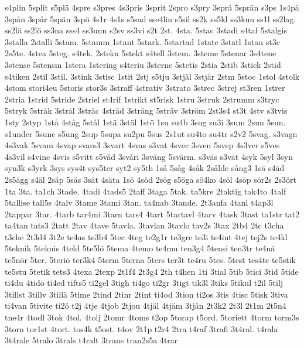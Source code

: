 {{s4plin
5split
s5pl^^e4
4spre
s3pres
4s3pris
3sprit
2spro
s3pry
3spr^^e5
5spr^^e4n
s3ps
1s4p^^e5
3sp^^e5n
3sp^^e5r
5sp^^e4n
3sp^^f6
4s1r
4s1s
s5sad
sse4lin
s5sil
ss2k
ss5kl
ss3kun
ss1l
ss2lag.
ss2l^^e4
ss2l^^f6
ss3na
sss4
ss3unn
s2sv
ss3vi
s2t
2st.
4sta.
5stac
3stadi
s4taf
5stalgis
3stalla
2stalli
5stam.
5stamm
1stant
5stark.
5startad
1state
3statl
1stau
st3c
2s5te.
4stea
5steg.
s4tek.
2stekn
5stekt
s4tell
3stem.
3steme
5stenar
3s4tene
3stense
5stensm
1stera
1stering
s4teriu
3sterne
5stetis
2stia
2stib
3stick
2stid
s4tiken
2stil
3stil.
3stink
3stisc
1stit
2stj
s5tju
3stj^^e4l
3stj^^e4r
2stm
5stoc
1stol
4stolk
4stom
stori4eu
5storis
stor3s
3straff
4strativ
3strato
3strec
3strej
st3ren
1strer
2stria
1strid
5stride
2striel
st4rif
1strikt
st5risk
1stru
3struk
2strumm
s3tryc
5stryk
5str^^e5k
3str^^e5l
3str^^e4c
4str^^e4d
3str^^e4ng
5str^^e4v
3str^^f6m
2st3s4
st3t
4stv
s3tvis
1sty
2styp
1st^^e5
4st^^e5g
5st^^e5l
1st^^e4
3st^^e4l
1st^^f6
1su
su4b
3sug
su3i
3sum
2sun
5sun.
s1under
5sune
s5ung
2sup
5supa
su2pu
5sus
2s1ut
su4to
su4tr
s2v2
5svag.
s3vagn
4s3vak
5svam
4svap
svars3
3svart
4svas
s3vat
4svec
3sven
5svep
4s3ver
s5ves
4s3vil
s4vine
4svis
s5vitt
s5v^^e5d
3sv^^e5ri
3sv^^e4ng
5sv^^e4rm.
s3v^^e4s
s3v^^e4t
4syk
5syl
3syn
syn3k
s3yrk
3sys
sys4t
sys5ter
syt2
sy5th
1s^^e5
5s^^e5g
4s^^e5k
2s^^e5lde
s^^e5ng3
1s^^e4
s4^^e4d
2s5^^e4gg
s4^^e4l
2s^^e4p
5s^^e4s
3s^^e4t
4s^^e4ta
1s^^f6
4s^^f6d
2s^^f6g
s5^^f6ga
s^^f64ko
4s^^f6l
4s^^f6p
s^^f6r2s
2s3^^f6rt
1ta
3ta.
ta1ch
3tade.
4tadi
4tads5
2taff
3taga
5tak.
ta5kre
2taktig
tak4to
4talf
5tallise
tall5s
4talv
3tame
3tami
3tan.
ta4nab
3tande.
2t3anfa
4tanl
t4ap3l
2tappar
3tar.
4tarb
tar4mi
3tarn
tars4
4tart
5tartavl
4tarv
4task
3tast
ta1str
tat2
ta4tan
tats3
2tatt
2tav
4tave
5tavla.
3tavlan
3tavlo
tav2s
3tax
2tb4
2tc
t3cha
t3che
2t3d4
3t2e
te4as
te3b4
5tec
4teg
te2g1r
te3gre
te3i
te4int
4tej
tej2s
te4kl
5teknik
5teknis
4teld
5te5l^^f6
5tema
4temo
te4mu
ten3g4
5tensi
ten3tr
te4n^^e4
te5n^^f6r
5ter.
5teri^^f6
ter3k4
5term
5terna
5ters
ter3t
te4ru
5tes.
5test
tes4te
te5stik
te5stu
5tetik
tets3
4texa
2texp
2t1f4
2t3g4
2th
t4hen
1ti
3tial
5tib
5tici
3tid
5tide
ti4du
4tid^^f6
ti4ed
tifts5
ti2gel
3tigh
ti4go
ti2gr
3tigt
tik3l
3tiks
5tikul
t2il
5tilj
3tillst
3tillv
3till^^e4
5time
2tind
2tinr
2tint
ti4od
3tion
ti2os
3tis
4tisc
5tisk
3tiva
ti4van
5tivite
ti2^^f6
t2j
4tje
4tjob
2tjou
4tj^^e4l
4tj^^e4m
3tj^^e4n
2t3k2
2t3l
2t1m
2t5n4
tne4r
4todl
3tok
4tol.
4tolj
2tomr
4toms
t2op
5torap
t5ord.
5toriett
4torm
torm3s
3torn
tor1st
4tort.
tos4k
t5ost.
t4ov
2t1p
t2r4
2tra
t4raf
3trafi
3t4ral.
t4rala
3t4rale
5tralo
3trals
t4ralt
3trans
tran2s5a
4trar
}}
